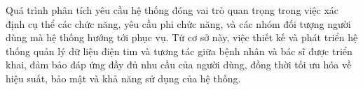 Quá trình phân tích yêu cầu hệ thống đóng vai trò quan trọng trong việc xác định cụ thể các chức năng, yêu cầu phi chức năng, và các nhóm đối tượng người dùng mà hệ thống hướng tới phục vụ.
Từ cơ sở này, việc thiết kế và phát triển hệ thống quản lý dữ liệu điện tim và tương tác giữa bệnh nhân và bác sĩ được triển khai, đảm bảo đáp ứng đầy đủ nhu cầu của người dùng,
đồng thời tối ưu hóa về hiệu suất, bảo mật và khả năng sử dụng của hệ thống.

\newpage